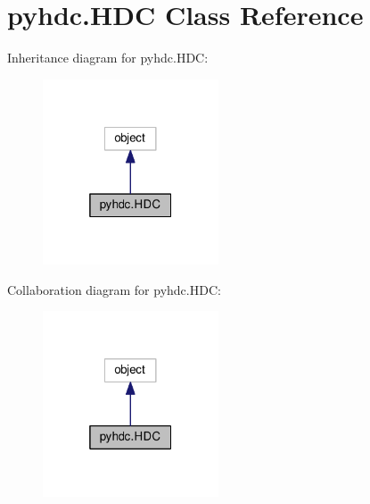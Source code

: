 \hypertarget{a00002}{}\section{pyhdc.\+H\+DC Class Reference}
\label{a00002}


Inheritance diagram for pyhdc.\+H\+DC\+:
\nopagebreak
\begin{figure}[H]
\begin{center}
\leavevmode
\includegraphics[width=148pt]{a00041}
\end{center}
\end{figure}


Collaboration diagram for pyhdc.\+H\+DC\+:
\nopagebreak
\begin{figure}[H]
\begin{center}
\leavevmode
\includegraphics[width=148pt]{a00042}
\end{center}
\end{figure}
